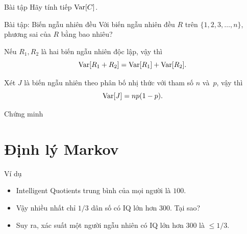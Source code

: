\begin{frame}{Bài tập}
  Hãy tính tiếp $\mathrm{Var}[C]$.
\end{frame}

\begin{frame}{Bài tập: Biến ngẫu nhiên đều}
  Với biến ngẫu nhiên đều $R$ trên $\{1,2,3, \dots, n\}$, phương sai của $R$ bằng bao nhiêu?
  
\end{frame}
\begin{frame}
  \begin{thrm}
    Nếu $R_1, R_2$ là hai biến ngẫu nhiên \alert{độc lập}, vậy thì 
    \[
      \mathrm{Var}[R_1 + R_2] = \mathrm{Var}[R_1] + \mathrm{Var}[R_2].
    \] 	
  \end{thrm}
  
\end{frame}

\begin{frame}%
  \begin{lmm}
    Xét $J$ là biến ngẫu nhiên theo phân bố nhị thức với tham số $n$ và~$p$, vậy thì 
    \[
      \mathrm{Var}[J] = n p(1-p).
    \] 		
  \end{lmm}\pause
  \begin{block}{Chứng minh}
     
    
    \vspace{-0.5cm}
    
  \end{block}
\end{frame}

\section{Định lý Markov}
\begin{frame}{Ví dụ}
  \begin{itemize}
  \item<+-> \alert{I}ntelligent \alert{Q}uotients trung bình của mọi người là $100$.
  \item<+-> Vậy nhiều nhất chỉ $1/3$ dân số có IQ lớn hơn $300$. Tại sao?
  \item<+-> Suy ra,  xác suất một người ngẫu nhiên có IQ lớn hơn $300$ là $\leq 1/3$.  
  \end{itemize}
\end{frame}

